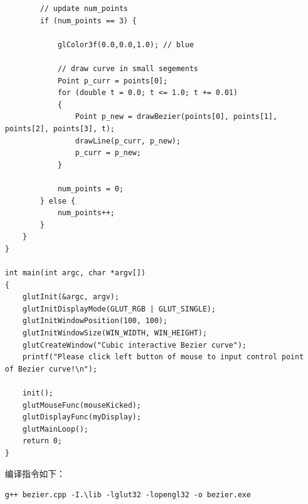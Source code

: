 \documentclass[logo,reportComp]{thesis}
\begin{document}
\begin{lstlisting}
        // update num_points
        if (num_points == 3) {

            glColor3f(0.0,0.0,1.0); // blue

            // draw curve in small segements
            Point p_curr = points[0];
            for (double t = 0.0; t <= 1.0; t += 0.01)
            {
                Point p_new = drawBezier(points[0], points[1], points[2], points[3], t);
                drawLine(p_curr, p_new);
                p_curr = p_new;
            }

            num_points = 0;
        } else {
            num_points++;
        }
    }
}

int main(int argc, char *argv[])
{
    glutInit(&argc, argv);
    glutInitDisplayMode(GLUT_RGB | GLUT_SINGLE);
    glutInitWindowPosition(100, 100);
    glutInitWindowSize(WIN_WIDTH, WIN_HEIGHT);
    glutCreateWindow("Cubic interactive Bezier curve");
    printf("Please click left button of mouse to input control point of Bezier curve!\n");

    init();
    glutMouseFunc(mouseKicked);
    glutDisplayFunc(myDisplay); 
    glutMainLoop();
    return 0;
}
\end{lstlisting}
编译指令如下：
\begin{flushleft}
\verb'g++ bezier.cpp -I.\lib -lglut32 -lopengl32 -o bezier.exe'
\end{flushleft}
\end{document}
